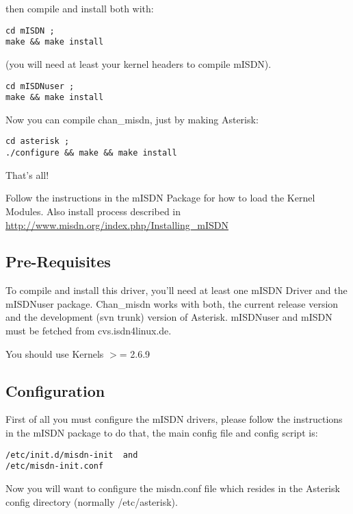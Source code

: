 then compile and install both with:
\begin{astlisting}
\begin{verbatim}
cd mISDN ;
make && make install
\end{verbatim}
\end{astlisting}
(you will need at least your kernel headers to compile mISDN).
\begin{astlisting}
\begin{verbatim}
cd mISDNuser ;
make && make install
\end{verbatim}
\end{astlisting}
Now you can compile chan\_misdn, just by making Asterisk:
\begin{astlisting}
\begin{verbatim}
cd asterisk ;
./configure && make && make install
\end{verbatim}
\end{astlisting}
That's all!

Follow the instructions in the mISDN Package for how to load the Kernel
Modules. Also install process described in \url{http://www.misdn.org/index.php/Installing_mISDN}

\subsection{Pre-Requisites}

To compile and install this driver, you'll need at least one mISDN Driver and
the mISDNuser package. Chan\_misdn works with both, the current release version
and the development (svn trunk) version of Asterisk. mISDNuser and mISDN must
be fetched from cvs.isdn4linux.de.

You should use Kernels $>$= 2.6.9


\subsection{Configuration}

First of all you must configure the mISDN drivers, please follow the
instructions in the mISDN package to do that, the main config file and config
script is:
\begin{astlisting}
\begin{verbatim}
/etc/init.d/misdn-init  and
/etc/misdn-init.conf
\end{verbatim}
\end{astlisting}
Now you will want to configure the misdn.conf file which resides in the
Asterisk config directory (normally /etc/asterisk).

